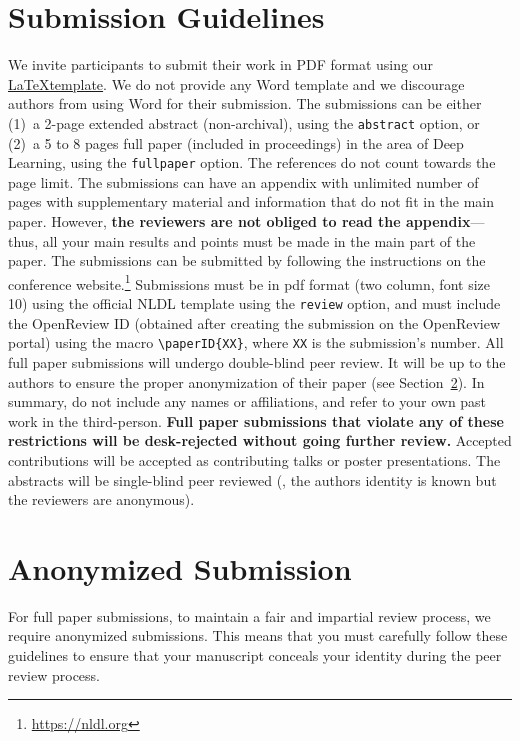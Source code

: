 \documentclass[fullpaper]{nldl}
\begin{document}
\section{Submission Guidelines}
We invite participants to submit their work in PDF format using our \href{https://github.com/SFI-Visual-Intelligence/nldl}{\LaTeX template}.
We do not provide any Word template and we discourage authors from using Word for their submission.
The submissions can be either (1)~a 2-page extended abstract (non-archival), using the \verb|abstract| option, or (2)~a 5 to 8 pages full paper (included in proceedings) in the area of Deep Learning, using the \verb|fullpaper| option.
The references do not count towards the page limit.
The submissions can have an appendix with unlimited number of pages with supplementary material and information that do not fit in the main paper.
However, \textbf{the reviewers are not obliged to read the appendix}---thus, all your main results and points must be made in the main part of the paper.
The submissions can be submitted by following the instructions on the conference website.\footnote{\url{https://nldl.org}}
Submissions must be in pdf format (two column, font size 10) using the official NLDL template using the \verb|review| option, and must include the OpenReview ID (obtained after creating the submission on the OpenReview portal) using the macro \verb|\paperID{XX}|, where \verb|XX| is the submission's number.
All full paper submissions will undergo double-blind peer review.
It will be up to the authors to ensure the proper anonymization of their paper (see Section~\ref{sec:anon}).
In summary, do not include any names or affiliations, and refer to your own past work in the third-person.
\textbf{Full paper submissions that violate any of these restrictions will be desk-rejected without going further review.}
Accepted contributions will be accepted as contributing talks or poster presentations.
The abstracts will be single-blind peer reviewed (\ie, the authors identity is known but the reviewers are anonymous).

\section{Anonymized Submission}
\label{sec:anon}

For full paper submissions, to maintain a fair and impartial review process, we require anonymized submissions.
This means that you must carefully follow these guidelines to ensure that your manuscript conceals your identity during the peer review process.
\end{document}

